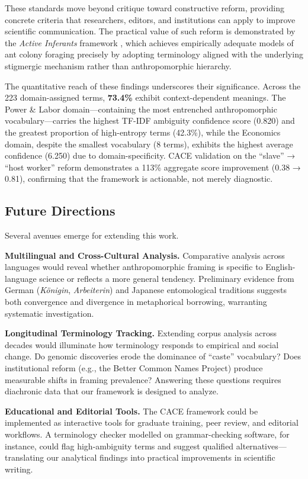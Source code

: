 \documentclass[
]{article}
\numberwithin{equation}{section}
\begin{document}
These standards move beyond critique toward constructive reform,
providing concrete criteria that researchers, editors, and institutions
can apply to improve scientific communication. The practical value of
such reform is demonstrated by the \emph{Active Inferants} framework
\cite{friedman2021active}, which achieves empirically adequate models of
ant colony foraging precisely by adopting terminology aligned with the
underlying stigmergic mechanism rather than anthropomorphic hierarchy.

The quantitative reach of these findings underscores their significance.
Across the 223 domain-assigned terms, \textbf{73.4\%} exhibit
context-dependent meanings. The Power \& Labor domain---containing the
most entrenched anthropomorphic vocabulary---carries the highest TF-IDF
ambiguity confidence score (0.820) and the greatest proportion of
high-entropy terms (42.3\%), while the Economics domain, despite the
smallest vocabulary (8 terms), exhibits the highest average confidence
(6.250) due to domain-specificity. CACE validation on the ``slave'' →
``host worker'' reform demonstrates a 113\% aggregate score improvement
(0.38 → 0.81), confirming that the framework is actionable, not merely
diagnostic.

\subsection{Future Directions}\label{future-directions-1}

Several avenues emerge for extending this work.

\textbf{Multilingual and Cross-Cultural Analysis.} Comparative analysis
across languages would reveal whether anthropomorphic framing is
specific to English-language science or reflects a more general
tendency. Preliminary evidence from German (\emph{Königin},
\emph{Arbeiterin}) and Japanese entomological traditions suggests both
convergence and divergence in metaphorical borrowing, warranting
systematic investigation.

\textbf{Longitudinal Terminology Tracking.} Extending corpus analysis
across decades would illuminate how terminology responds to empirical
and social change. Do genomic discoveries erode the dominance of
``caste'' vocabulary? Does institutional reform (e.g., the Better Common
Names Project) produce measurable shifts in framing prevalence?
Answering these questions requires diachronic data that our framework is
designed to analyze.

\textbf{Educational and Editorial Tools.} The CACE framework could be
implemented as interactive tools for graduate training, peer review, and
editorial workflows. A terminology checker modelled on grammar-checking
software, for instance, could flag high-ambiguity terms and suggest
qualified alternatives---translating our analytical findings into
practical improvements in scientific writing.
\end{document}
